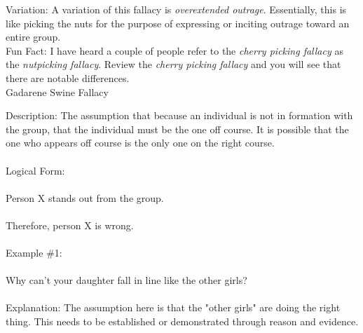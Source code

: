 \documentclass[a4paper,12pt,single,pdftex]{scrbook}
\begin{document}
    
      Variation: A variation of this fallacy is {\it overextended outrage}. Essentially, this is like picking the nuts for the purpose of expressing or inciting outrage toward an entire group.
    \\

    
      Fun Fact: I have heard a couple of people refer to the {\em cherry picking fallacy} as the {\em nutpicking fallacy}. Review the {\em cherry picking fallacy} and you will see that there are notable differences.
    \\

  

Gadarene Swine Fallacy
    
      Description: The assumption that because an individual is not in formation with the group, that the individual must be the one off course. It is possible that the one who appears off course is the only one on the right course.
    \\

    
      
    \\

    
      Logical Form:
    \\

    
      
    \\

    
      Person X stands out from the group.
    \\

    
      
    \\

    
      Therefore, person X is wrong.
    \\

    
      
    \\

    
      Example \#1:
    \\

    
      
    \\

    
      Why can't your daughter fall in line like the other girls?
    \\

    
      
    \\

    
      Explanation: The assumption here is that the "other girls" are doing the right thing. This needs to be established or demonstrated through reason and evidence.
    \\
\end{document}
